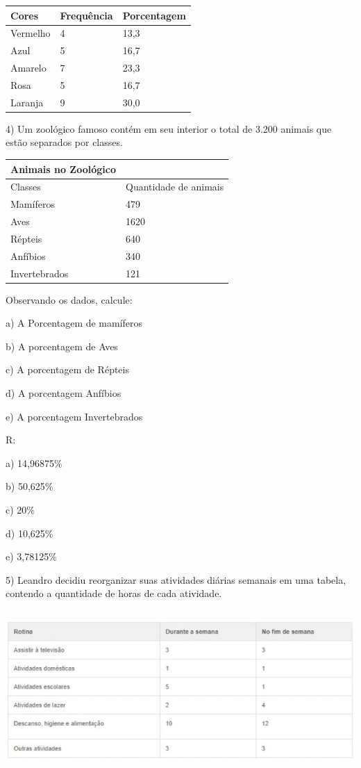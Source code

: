 
\begin{longtable}[]{@{}lll@{}}
\toprule
Cores & Frequência & Porcentagem\tabularnewline
\midrule
\endhead
Vermelho & 4 & 13,3\tabularnewline
Azul & 5 & 16,7\tabularnewline
Amarelo & 7 & 23,3\tabularnewline
Rosa & 5 & 16,7\tabularnewline
Laranja & 9 & 30,0\tabularnewline
\bottomrule
\end{longtable}

4) Um zoológico famoso contém em seu interior o total de 3.200 animais
que estão separados por classes.


\begin{longtable}[]{@{}ll@{}}
\toprule
Animais no Zoológico &\tabularnewline
\midrule
\endhead
Classes & Quantidade de animais\tabularnewline
Mamíferos & 479\tabularnewline
Aves & 1620\tabularnewline
Répteis & 640\tabularnewline
Anfíbios & 340\tabularnewline
Invertebrados & 121\tabularnewline
\bottomrule
\end{longtable}

Observando os dados, calcule:

a) A Porcentagem de mamíferos

b) A porcentagem de Aves

c) A porcentagem de Répteis

d) A porcentagem Anfíbios

e) A porcentagem Invertebrados

R:

a) 14,96875\%

b) 50,625\%

c) 20\%

d) 10,625\%

e) 3,78125\%

5) Leandro decidiu reorganizar suas atividades diárias semanais em uma
tabela, contendo a quantidade de horas de cada atividade.

\includegraphics[width=5.90556in,height=2.41638in]{./imgSAEB_6_MAT/media/image83.png}


